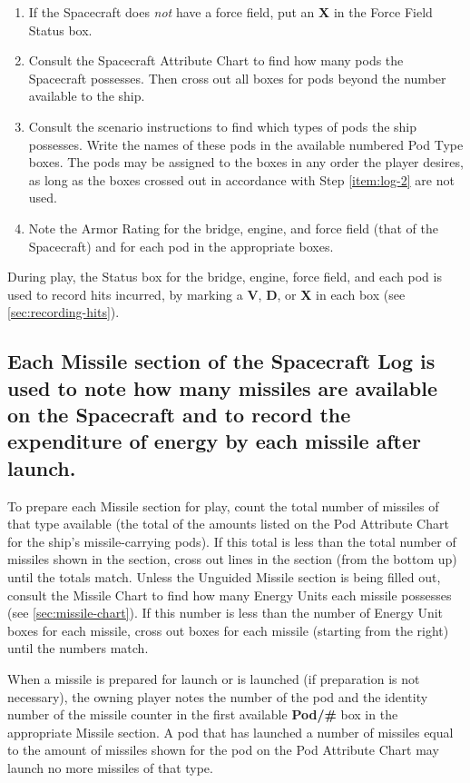 \begin{enumerate}
\item If the Spacecraft does \emph{not} have a force field, put an
  \textbf{\textsf{X}} in the Force Field Status box.
\item Consult the Spacecraft Attribute Chart to find how many pods the
  Spacecraft possesses. Then cross out all boxes for pods beyond the
  number available to the ship.\label{item:log-2}
\item Consult the scenario instructions to find which types of pods
  the ship possesses. Write the names of these pods in the available
  numbered Pod Type boxes. The pods may be assigned to the boxes in
  any order the player desires, as long as the boxes crossed out in
  accordance with Step \ref{item:log-2} are not used.
\item Note the Armor Rating for the bridge, engine, and force field
  (that of the Spacecraft) and for each pod in the appropriate boxes.
\end{enumerate}

During play, the Status box for the bridge, engine, force field, and
each pod is used to record hits incurred, by marking a \textbf{V},
\textbf{D}, or \textbf{\textsf{X}} in each box (see \ref{sec:recording-hits}).


\subsection[Missile Section]{Each Missile section of the Spacecraft
  Log is used to note 
  how many missiles are available on the  
  Spacecraft and to record the expenditure of energy by each missile
  after launch.}
\label{sec:missile-section}



To prepare each Missile section for play, count the total number of
missiles of that type available (the total of the amounts listed on
the Pod Attribute Chart for the ship's missile-carrying pods). If this
total is less than the total number of missiles shown in the section,
cross out lines in the section (from the bottom up) until the totals
match. Unless the Unguided Missile section is being filled out,
consult the Missile Chart to find how many Energy Units each missile
possesses (see \ref{sec:missile-chart}). If this number is less than
the number of Energy Unit boxes for each missile, cross out boxes for
each missile (starting from the right) until the numbers match.

When a missile is prepared for launch or is launched (if preparation
is not necessary), the owning player notes the number of the pod and
the identity number of the missile counter in the first available
\textbf{Pod/\#} box in the appropriate Missile section. A pod that has
launched a number of missiles equal to the amount of missiles shown
for the pod on the Pod Attribute Chart may launch no more missiles of
that type.

